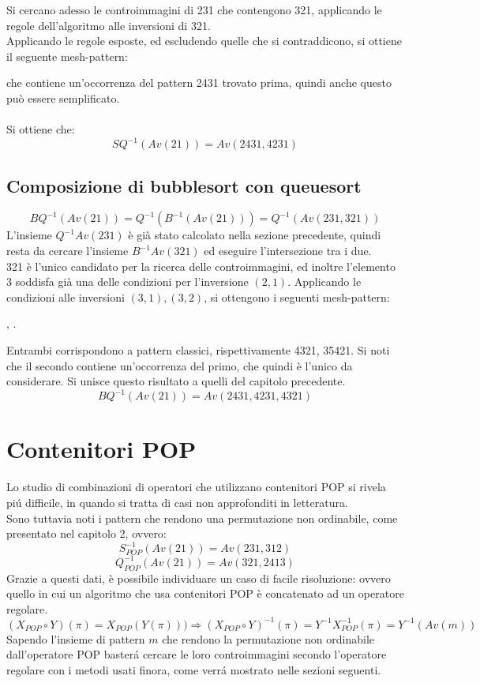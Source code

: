Si cercano adesso le controimmagini di 231 che contengono 321, applicando le regole dell'algoritmo alle inversioni di 321.\\
Applicando le regole esposte, ed escludendo quelle che si contraddicono, si ottiene il seguente mesh-pattern: 
\begin{center}
\end{center}
che contiene un'occorrenza del pattern 2431 trovato prima, quindi anche questo pu\`o essere semplificato.\\\\
Si ottiene che:$$SQ^{-1}(Av(21)) = Av(2431, 4231)$$
\subsection*{Composizione di {bubblesort} con {queuesort}}
$$BQ^{-1}(Av(21)) = Q^{-1}(B^{-1}(Av(21))) = Q^{-1}(Av(231,321))$$
L'insieme $Q^{-1}Av(231)$ \`e gi\`a stato calcolato nella sezione precedente, quindi resta da cercare l'insieme $B^{-1}Av(321)$ ed eseguire l'intersezione tra i due.\\321 \`e l'unico candidato per la ricerca delle controimmagini, ed inoltre l'elemento 3 soddisfa gi\`a una delle condizioni per l'inversione $(2,1)$. Applicando le condizioni alle inversioni $(3,1),(3,2)$, si ottengono i seguenti mesh-pattern:
\begin{center}
,
.
\end{center}  
Entrambi corrispondono a pattern classici, rispettivamente 4321, 35421. Si noti che il secondo contiene un'occorrenza del primo, che quindi \`e l'unico da considerare. Si unisce questo risultato a quelli del capitolo precedente.
$$BQ^{-1}(Av(21)) = Av(2431, 4231, 4321)$$ 
\section*{Contenitori POP}
Lo studio di combinazioni di operatori che utilizzano contenitori POP si rivela pi\'u difficile, in quando si tratta di casi non approfonditi in letteratura.\\
Sono tuttavia noti i pattern che rendono una permutazione non ordinabile, come presentato nel capitolo 2, ovvero:
$$S_{POP}^{-1}(Av(21)) = Av(231,312)$$$$Q_{POP}^{-1}(Av(21))=Av(321,2413)$$
Grazie a questi dati, \`e possibile individuare un caso di facile risoluzione: ovvero quello in cui un algoritmo che usa contenitori POP \`e concatenato ad un operatore regolare.
$$(X_{POP}\circ{Y})(\pi)= X_{POP}(Y(\pi)))\Rightarrow(X_{POP}\circ{Y})^{-1}(\pi) = Y^{-1}X_{POP}^{-1}(\pi)=Y^{-1}(Av(m))$$
Sapendo l'insieme di pattern $m$ che rendono la permutazione non ordinabile dall'operatore POP baster\'a cercare le loro controimmagini secondo l'operatore regolare con i metodi usati finora, come verr\'a mostrato nelle sezioni seguenti.
